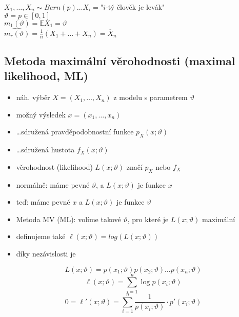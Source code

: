 \documentclass[../main.tex]{subfiles}
\begin{document}
\begin{example}
    $X_1,\dots,X_n \sim Bern(p) \dots X_i = $"$i$-tý člověk je levák"\\
    $\vartheta = p \in \left[0,1\right]$\\
    $m_1(\vartheta) = \mathbb{E}X_1 = \vartheta$\\
    $\widehat{m_r(\vartheta)} = \frac{1}{n}(X_1+\dots+X_n) = \overline{X}_n$
\end{example}

\subsection{Metoda maximální věrohodnosti (maximal likelihood, ML)}
\begin{itemize}
    \item náh. výběr $X = (X_1,\dots,X_n)$ z modelu s parametrem $\vartheta$
    \item možný výsledek $x = (x_1,\dots,x_n)$
    \item \dots sdružená pravděpodobnostní funkce $p_X(x;\vartheta)$
    \item \dots sdružená hustota $f_X(x;\vartheta)$
    \item věrohodnost (likelihood) $L(x;\vartheta)$ značí $p_X$ nebo $f_X$
    \item normálně: máme pevné $\vartheta$, a $L(x;\vartheta)$ je funkce $x$
    \item teď: máme pevné $x$ a $L(x;\vartheta)$ je funkce $\vartheta$
\end{itemize}
\begin{itemize}
    \item Metoda MV (ML): volíme takové $\vartheta$, pro které je $L(x;\vartheta)$ maximální
    \item definujeme také $\ell(x;\vartheta) = log(L(x;\vartheta))$
    \item díky nezávislosti je
\end{itemize}
\[L(x;\vartheta) = p(x_1;\vartheta)p(x_2;\vartheta)\dots p(x_n;\vartheta)\]
\[\ell(x;\vartheta) = \sum^n_{i=1} \log p(x_i;\vartheta)\]
\[ 0 = \ell'(x;\vartheta) = \sum_{i=1}^n\frac{1}{p(x_i;\vartheta)}\cdot p'(x_i;
\vartheta)\]
\end{document}
